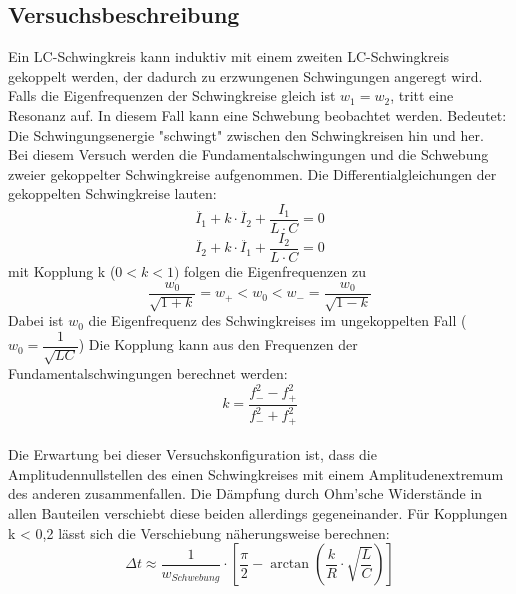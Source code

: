 \documentclass[12pt,a4paper]{article}
\begin{document}
\subsection{Versuchsbeschreibung}
Ein LC-Schwingkreis kann induktiv mit einem zweiten LC-Schwingkreis gekoppelt werden, der dadurch zu erzwungenen Schwingungen angeregt wird. Falls die Eigenfrequenzen der Schwingkreise gleich ist $w_1 = w_2$, tritt eine Resonanz auf. In diesem Fall kann eine Schwebung beobachtet werden. Bedeutet: Die Schwingungsenergie "schwingt" zwischen den Schwingkreisen hin und her. \\
Bei diesem Versuch werden die Fundamentalschwingungen und die Schwebung zweier gekoppelter Schwingkreise aufgenommen. Die Differentialgleichungen der gekoppelten Schwingkreise lauten:
\begin{equation}
\ddot{I_1} + k \cdot \ddot{I_2} + \dfrac{I_1}{L \cdot C} = 0
\end{equation}
\begin{equation}
\ddot{I_2} + k \cdot \ddot{I_1} + \dfrac{I_2}{L \cdot C} = 0
\end{equation}
mit Kopplung k ($0 < k < 1)$ folgen die Eigenfrequenzen zu
\begin{equation}
\dfrac{w_0}{\sqrt{1+k}} = w_+ < w_0 < w_- = \dfrac{w_0}{\sqrt{1-k}} 
\end{equation}
Dabei ist $w_0$ die Eigenfrequenz des Schwingkreises im ungekoppelten Fall ($w_0 = \dfrac{1}{\sqrt{LC}}$)
Die Kopplung kann aus den Frequenzen der Fundamentalschwingungen berechnet werden:
\begin{equation}
k = \dfrac{f_-^2 - f_+^2}{f_-^2 + f_+^2}
\label{eq:Kopplung}
\end{equation}
\\ Die Erwartung bei dieser Versuchskonfiguration ist, dass die Amplitudennullstellen des einen Schwingkreises mit einem Amplitudenextremum des anderen zusammenfallen. Die Dämpfung durch Ohm'sche Widerstände in allen Bauteilen verschiebt diese beiden allerdings gegeneinander. Für Kopplungen k < 0,2 lässt sich die Verschiebung näherungsweise berechnen:
\begin{equation}
\Delta t \approx \dfrac{1}{w_{Schwebung}} \cdot \left[\dfrac{\pi}{2} - \arctan \left( \dfrac{k}{R} \cdot \sqrt{\dfrac{L}{C}} \right)\right]
\label{eq:delta_t}
\end{equation}
\end{document}
